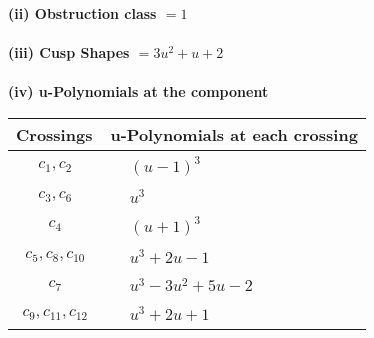 \documentclass[1p]{elsarticle_modified}
\theoremstyle{definition}
\begin{document}
\flushleft \textbf{(ii) Obstruction class $= 1$}\\~\\
\flushleft \textbf{(iii) Cusp Shapes $= 3 u^2+u+2$}\\~\\
\newpage\renewcommand{\arraystretch}{1}
\flushleft \textbf{(iv) u-Polynomials at the component}\newline \\
\begin{tabular}{m{50pt}|m{274pt}}
Crossings & \hspace{64pt}u-Polynomials at each crossing \\
\hline $$\begin{aligned}c_{1},c_{2}\end{aligned}$$&$\begin{aligned}
&(u-1)^3
\end{aligned}$\\
\hline $$\begin{aligned}c_{3},c_{6}\end{aligned}$$&$\begin{aligned}
&u^3
\end{aligned}$\\
\hline $$\begin{aligned}c_{4}\end{aligned}$$&$\begin{aligned}
&(u+1)^3
\end{aligned}$\\
\hline $$\begin{aligned}c_{5},c_{8},c_{10}\end{aligned}$$&$\begin{aligned}
&u^3+2 u-1
\end{aligned}$\\
\hline $$\begin{aligned}c_{7}\end{aligned}$$&$\begin{aligned}
&u^3-3 u^2+5 u-2
\end{aligned}$\\
\hline $$\begin{aligned}c_{9},c_{11},c_{12}\end{aligned}$$&$\begin{aligned}
&u^3+2 u+1
\end{aligned}$\\
\hline
\end{tabular}\\~\\
\newpage\renewcommand{\arraystretch}{1}
\end{document}
